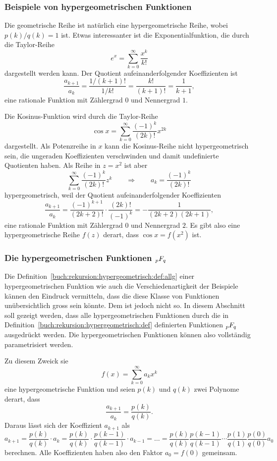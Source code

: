 %
%
\subsubsection{Beispiele von hypergeometrischen Funktionen}
Die geometrische Reihe ist natürlich eine hypergeometrische Reihe,
wobei $p(k)/q(k)=1$ ist.
Etwas interessanter ist die Exponentialfunktion, die durch die Taylor-Reihe
%
\[
e^x = \sum_{k=0}^\infty \frac{x^k}{k!}
\]
dargestellt werden kann.
Der Quotient aufeinanderfolgender Koeffizienten ist
\[
\frac{a_{k+1}}{a_k}
=
\frac{1/(k+1)!}{1/k!}
=
\frac{k!}{(k+1)!}
=
\frac{1}{k+1},
\]
eine rationale Funktion mit Zählergrad $0$ und Nennergrad $1$.

Die Kosinus-Funktion wird durch die Taylor-Reihe
\[
\cos x = \sum_{k=0}^\infty \frac{(-1)^k}{(2k)!} x^{2k}
\]
dargestellt.
Als Potenzreihe in $x$ kann die Kosinus-Reihe nicht hypergeometrisch sein,
die ungeraden Koeffizienten verschwinden und damit undefinierte
Quotienten haben.
Als Reihe in $z=x^2$ ist aber
\[
\sum_{k=0}^\infty \frac{(-1)^k}{(2k)!} z^k
\qquad\Rightarrow\qquad
a_k = \frac{(-1)^k}{(2k)!}
\]
hypergeometrisch, weil der Quotient aufeinanderfolgender Koeffizienten
\[
\frac{a_{k+1}}{a_k}
=
\frac{(-1)^{k+1}}{(2k+2)!}\cdot \frac{(2k)!}{(-1)^k}
=
-\frac{1}{(2k+2)(2k+1)},
\]
eine rationale Funktion mit Zählergrad $0$ und Nennergrad $2$.
Es gibt also eine hypergeometrische Reihe $f(z)$ derart, dass
$\cos x = f(x^2)$ ist.

%
%
\subsubsection{Die hypergeometrischen Funktionen $\mathstrut_pF_q$}
Die Definition~\ref{buch:rekursion:hypergeometrisch:def:allg}
einer hypergeometrischen Funktion wie auch die Verschiedenartigkeit
der Beispiele kännen den Eindruck vermitteln, dass die diese Klasse
von Funktionen unübersichtlich gross sein könnte.
Dem ist jedoch nicht so.
In diesem Abschnitt soll gezeigt werden, dass alle hypergeometrischen
Funktionen durch die in
Definition~\ref{buch:rekursion:hypergeometrisch:def} definierten
Funktionen $\mathstrut_pF_q$ ausgedrückt werden.
Die hypergeometrischen Funktionen können also vollständig parametrisiert
werden.

Zu diesem Zweick sie
\[
f(x)
=
\sum_{k=0}^\infty a_kx^k
\]
eine hypergeometrische Funktion und
seien $p(k)$ und $q(k)$ zwei Polynome derart, dass
\[
\frac{a_{k+1}}{a_k} = \frac{p(k)}{q(k)}.
\]
Daraus lässt sich der Koeffizient $a_{k+1}$ als
\begin{equation}
a_{k+1}
=
\frac{p(k)}{q(k)}
\cdot
a_k
=
\frac{p(k)}{q(k)}
\cdot
\frac{p(k-1)}{q(k-1)}
\cdot
a_{k-1}
=\dots=
\frac{p(k)}{q(k)}
\frac{p(k-1)}{q(k-1)}
\cdots
\frac{p(1)}{q(1)}
\frac{p(0)}{q(0)}
a_0
\label{buch:rekursion:hypergeometrisch:ak+1}
\end{equation}
berechnen.
Alle Koeffizienten haben also den Faktor $a_0=f(0)$ gemeinsam.

